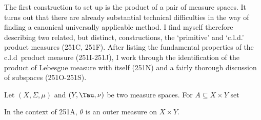 
\def\chaptername{Product measures}
\def\sectionname{Finite products}


The first construction to set up is the product of a pair of measure
spaces.    It turns out that there are already substantial technical
difficulties in the way of finding a canonical universally applicable
method.   I find myself therefore describing two related, but distinct,
constructions, the `primitive' and `c.l.d.' product measures (251C,
251F).   After listing the fundamental properties of the c.l.d\ product
measure (251I-251J), I work through the identification of the product of
Lebesgue measure with itself (251N) and a fairly thorough discussion of
subspaces (251O-251S).

 Let $(X,\Sigma,\mu)$ and $(Y,\Tau,\nu)$
be two
measure spaces.   For $A\subseteq X\times Y$ set



 In the context of 251A, $\theta$ is an outer
measure on $X\times Y$.


